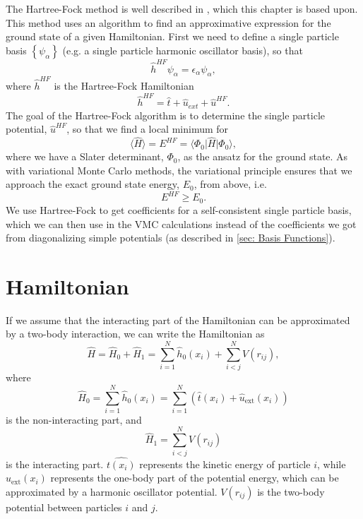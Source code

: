 \documentclass[../main.tex]{subfiles}
\begin{document}
The Hartree-Fock method is well described in \cite{basicMB}, which this chapter is based upon. This method uses an algorithm to find an approximative expression for the ground state of a given Hamiltonian. First we need to define a single particle basis $\left\{\psi_\alpha\right\}$ (e.g. a single particle harmonic oscillator basis), so that 
\begin{equation}
    \hat{h}^{HF}\psi_\alpha = \epsilon_\alpha \psi_\alpha,
\end{equation}
where $\hat{h}^{HF}$ is the Hartree-Fock Hamiltonian
\begin{equation}
    \hat{h}^{HF} = \hat{t} + \hat{u}_{ext} + \hat{u}^{HF}.
\end{equation}
The goal of the Hartree-Fock algorithm is to determine the single particle potential, $\hat{u}^{HF}$, so that we find a local minimum for
\begin{equation}
    \langle \hat{H} \rangle = E^{HF} = \langle \Phi_0 \vert \hat{H} \vert \Phi_0 \rangle,
\end{equation}
where we have a Slater determinant, $\Phi_0$, as the ansatz for the ground state. As with variational Monte Carlo methods, the variational principle ensures that we approach the exact ground state energy, $E_0$, from above, i.e.
\begin{equation}
    E^{HF} \geq E_0.
\end{equation}
We use Hartree-Fock to get coefficients for a self-consistent single particle basis, which we can then use in the VMC calculations instead of the coefficients we got from diagonalizing simple potentials (as described in \ref{sec: Basis Functions}).

\section{Hamiltonian}

If we assume that the interacting part of the Hamiltonian can be approximated by a two-body interaction, we can write the Hamiltonian as
\begin{equation}
    \hat{H} = \hat{H}_0 + \hat{H}_1 = \sum_{i=1}^N \hat{h}_0(x_i) + \sum_{i<j}^N V(r_{ij}),
\end{equation}
where
\begin{equation}
    \hat{H}_0 = \sum_{i=1}^N \hat{h}_0(x_i) = \sum_{i=1}^N \left( \hat{t}(x_i) + \hat{u}_{\textrm{ext}}(x_i) \right)
\end{equation}
is the non-interacting part, and
\begin{equation}
    \hat{H}_1 = \sum_{i<j}^N V(r_{ij})
\end{equation}
is the interacting part. $\hat{t(x_i)}$ represents the kinetic energy of particle $i$, while $\hat{u}_{\textrm{ext}}(x_i)$ represents the one-body part of the potential energy, which can be approximated by a harmonic oscillator potential. $V(r_{ij})$ is the two-body potential between particles $i$ and $j$.
\end{document}
